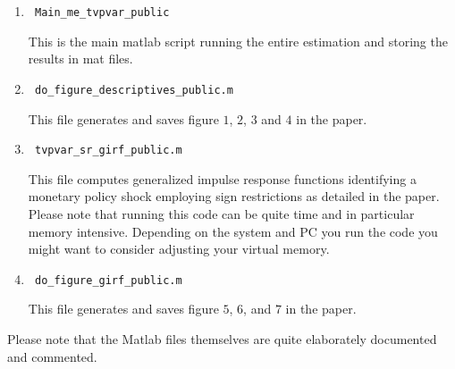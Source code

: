 \documentclass[12pt]{article}
\begin{document}
\begin{enumerate}
\item \begin{verbatim} Main_me_tvpvar_public \end{verbatim}This is the main matlab script running the entire estimation and storing the results in mat files. 

\item \begin{verbatim} do_figure_descriptives_public.m \end{verbatim}This file generates and saves figure $1$, $2$, $3$ and $4$ in the paper. 

\item \begin{verbatim} tvpvar_sr_girf_public.m \end{verbatim}This file computes generalized impulse response functions identifying a monetary policy shock employing sign restrictions as detailed in the paper. Please note that running this code can be quite time and in particular memory intensive. Depending on the system and PC you run the code you might want to consider adjusting your virtual memory. 

\item \begin{verbatim} do_figure_girf_public.m \end{verbatim}This file generates and saves figure $5$, $6$, and $7$ in the paper. 
\end{enumerate}
 
Please note that the Matlab files themselves are quite elaborately documented and commented.
\end{document}
